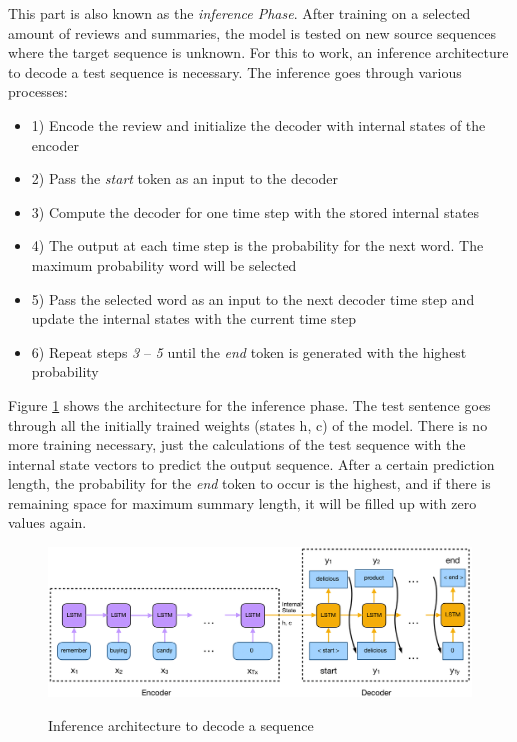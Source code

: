This part is also known as the \textit{inference Phase}. After training on a selected amount of reviews and summaries, the model is tested on new source sequences where the target sequence is unknown. For this to work, an inference architecture to decode a test sequence is necessary. The inference goes through various processes:

\begin{itemize}
	\item 1) Encode the review and initialize the decoder with internal states of the encoder
	\item 2) Pass the \textit{start} token as an input to the decoder
	\item 3) Compute the decoder for one time step with the stored internal states
	\item 4) The output at each time step is the probability for the next word. The maximum probability word will be selected
	\item 5) Pass the selected word as an input to the next decoder time step and update the internal states with the current time step
	\item 6) Repeat steps \textit{3} – \textit{5} until the \textit{end} token is generated with the highest probability
\end{itemize}

Figure \ref{infer} shows the architecture for the inference phase. The test sentence goes through all the initially trained weights (states h, c) of the model. There is no more training necessary, just the calculations of the test sequence with the internal state vectors to predict the output sequence. After a certain prediction length, the probability for the \textit{end} token to occur is the highest, and if there is remaining space for maximum summary length, it will be filled up with zero values again. 

\begin{figure}
	\begin{center}
		\includegraphics[width=5in]{photos/infer-1}\\
		\caption{Inference architecture to decode a sequence}\label{infer}
	\end{center}
\end{figure}

